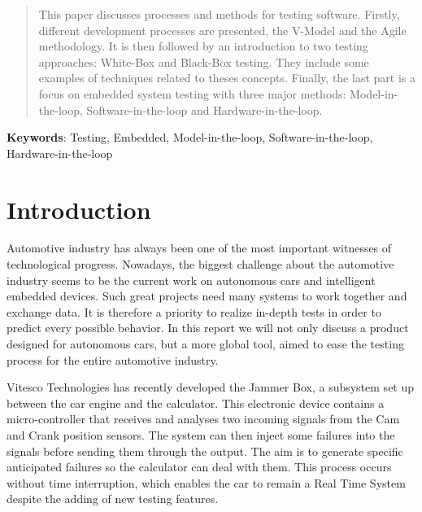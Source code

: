 \maketitle
\begin{abstract}

This paper discusses processes and methods for testing software.
Firstly, different development processes are presented, the V-Model and the Agile methodology.
It is then followed by an introduction to two testing approaches: White-Box and Black-Box testing. They include some examples of techniques related to theses concepts.
Finally, the last part is a focus on embedded system testing with three major methods: Model-in-the-loop, Software-in-the-loop and Hardware-in-the-loop.
    
\end{abstract}

\begin{center}
\vspace{2em}
    \textbf{Keywords}: Testing, Embedded, Model-in-the-loop, Software-in-the-loop, Hardware-in-the-loop
\end{center}



\newpage
\tableofcontents

\newpage


\section*{Introduction}
Automotive industry has always been one of the most important witnesses of technological progress. Nowadays, the biggest challenge about the automotive industry seems to be the current work on autonomous cars and intelligent embedded devices. Such great projects need many systems to work together and exchange data. It is therefore a priority to realize in-depth tests in order to predict every possible behavior. In this report we will not only discuss a product designed for autonomous cars, but a more global tool, aimed to ease the testing process for the entire automotive industry.

Vitesco Technologies has recently developed the Jammer Box, a subsystem set up between the car engine and the calculator. This electronic device contains a micro-controller that receives and analyses two incoming signals from the Cam and Crank position sensors. The system can then inject some failures into the signals before sending them through the output. The aim is to generate specific anticipated failures so the calculator can deal with them. This process occurs without time interruption, which enables the car to remain a Real Time System despite the adding of new testing features. 

